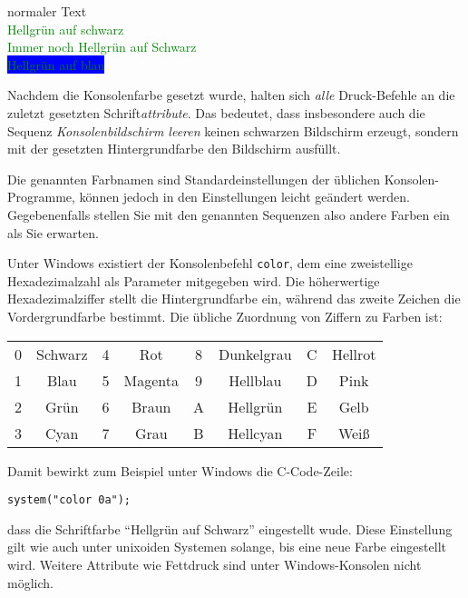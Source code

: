 \begin{cmdbox}
normaler Text\\
\textcolor{green}{Hellgrün auf schwarz}\\
\textcolor{green}{Immer noch Hellgrün auf Schwarz}\\
\colorbox {blue} {\textcolor{green}{Hellgrün auf blau}}
\end{cmdbox}

Nachdem die Konsolenfarbe gesetzt wurde, halten sich \emph{alle} Druck-Befehle an die zuletzt gesetzten Schrift\emph{attribute}. Das bedeutet, dass insbesondere auch die Sequenz \emph{Konsolenbildschirm leeren} keinen schwarzen Bildschirm erzeugt, sondern mit der gesetzten Hintergrundfarbe den Bildschirm ausfüllt.

Die genannten Farbnamen sind Standardeinstellungen der üblichen Konsolen-Programme, können jedoch in den Einstellungen leicht geändert werden. Gegebenenfalls stellen Sie mit den genannten Sequenzen also andere Farben ein als Sie erwarten.

\begin{hintbox}
Unter Windows existiert der Konsolenbefehl \texttt{color}, dem eine zweistellige Hexadezimalzahl als Parameter mitgegeben wird. Die höherwertige Hexadezimalziffer stellt die Hintergrundfarbe ein, während das zweite Zeichen die Vordergrundfarbe bestimmt. Die übliche Zuordnung von Ziffern zu Farben ist:
\begin{center}
\begin{tabular}{cc|cc||cc|cc}
	0 & Schwarz	& 4 & Rot		&	8 & Dunkelgrau	& C & Hellrot \\
	1 & Blau		& 5 & Magenta	&	9 &	Hellblau		& D & Pink    \\
	2 & Grün		& 6 & Braun		&	A &	Hellgrün		& E & Gelb    \\
	3 & Cyan		& 7 & Grau		&	B & Hellcyan		& F & Weiß
\end{tabular}
\end{center}
Damit bewirkt zum Beispiel unter Windows die C-Code-Zeile:
\begin{center}
	\texttt{system("color 0a");}
\end{center}
dass die Schriftfarbe \enquote{Hellgrün auf Schwarz} eingestellt wude. Diese Einstellung gilt wie auch unter unixoiden Systemen solange, bis eine neue Farbe eingestellt wird. Weitere Attribute wie Fettdruck sind unter Windows-Konsolen nicht möglich.
\end{hintbox}
